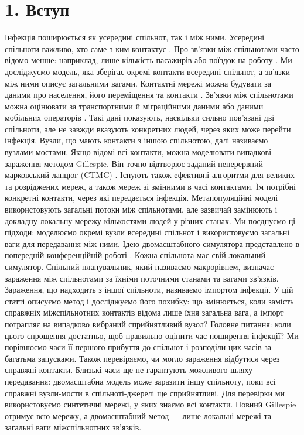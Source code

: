 \documentclass[11pt,a4paper]{article}
\begin{document}
\section*{1. Вступ}

Інфекція поширюється як усередині спільнот, так і між ними. Усередині спільноти важливо, хто саме з ким контактує \citep{keeling2005,pastorsatorras2015,kiss2017}. Про зв'язки між спільнотами часто відомо менше: наприклад, лише кількість пасажирів або поїздок на роботу \citep{balcan2009,barbosa2018human}. Ми досліджуємо модель, яка зберігає окремі контакти всередині спільнот, а зв'язки між ними описує загальними вагами.
Контактні мережі можна будувати за даними про населення, його переміщення та контакти \citep{eubank2004,danon2011}. Зв'язки між спільнотами можна оцінювати за транспортними й міграційними даними або даними мобільних операторів \citep{barbosa2018human,chang2021}. Такі дані показують, наскільки сильно пов'язані дві спільноти, але не завжди вказують конкретних людей, через яких може перейти інфекція. Вузли, що мають контакти з іншою спільнотою, далі називаємо вузлами-мостами.
Якщо відомі всі контакти, можна моделювати випадкові зараження методом Gillespie. Він точно відтворює заданий неперервний марковський ланцюг (CTMC) \citep{gillespie1977exact,gibson2000}. Існують також ефективні алгоритми для великих та розріджених мереж, а також мереж  зі змінними в часі контактами\citep{vestergaard2015,kuryliak2025simulating}. Їм потрібні конкретні контакти, через які передається інфекція. Метапопуляційні моделі використовують загальні потоки між спільнотами, але зазвичай замінюють і докладну локальну мережу кількостями людей у різних станах\citep{colizza2007reaction,colizza2008,balcan2010modeling,ajelli2010}. Ми поєднуємо ці підходи: моделюємо окремі вузли всередині спільнот і використовуємо загальні ваги для передавання між ними.
Ідею двомасштабного симулятора представлено в попередній конференційній роботі \citep{kuryliak2025towards}. Кожна спільнота має свій локальний симулятор. Спільний планувальник, який називаємо макрорівнем, визначає зараження між спільнотами за їхніми поточними станами та вагами зв'язків. Зараження, що надходить з іншої спільноти, називаємо імпортом інфекції. У цій статті описуємо метод і досліджуємо його похибку: що змінюється, коли замість справжніх міжспільнотних контактів відома лише їхня загальна вага, а імпорт потрапляє на випадково вибраний сприйнятливий вузол?
Головне питання: коли цього спрощення достатньо, щоб правильно оцінити час поширення інфекції? Ми порівнюємо часи її першого прибуття до спільнот і розподіли цих часів за багатьма запусками. Також перевіряємо, чи могло зараження відбутися через справжні контакти. Близькі часи ще не гарантують можливого шляху передавання: двомасштабна модель може заразити іншу спільноту, поки всі справжні вузли-мости в спільноті-джерелі ще сприйнятливі. Для перевірки ми використовуємо синтетичні мережі, у яких знаємо всі контакти. Повний Gillespie отримує всю мережу, а двомасштабний метод --- лише локальні мережі та загальні ваги міжспільнотних зв'язків.
\end{document}
